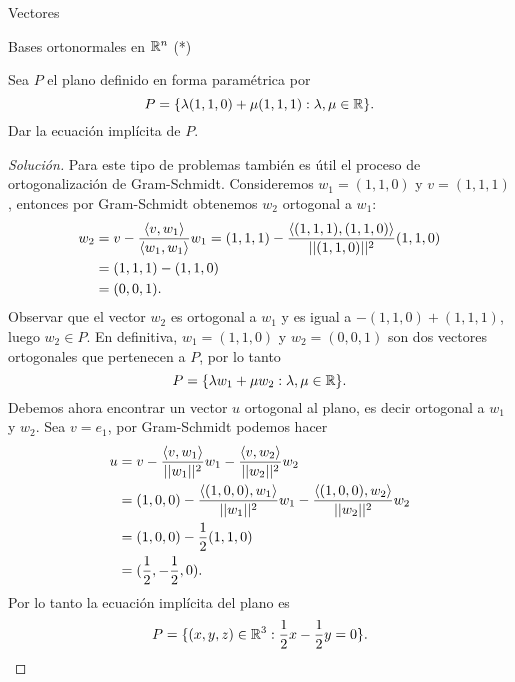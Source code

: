 \begin{chapter}{Vectores}
\begin{section}{Bases ortonormales en $\mathbb R^n$ (*)}
\begin{ejemplo*}
    Sea $P$ el plano definido en forma paramétrica por 
    \begin{equation*}
        P = \{\lambda(1,1,0) + \mu(1,1,1): \lambda, \mu \in \mathbb R\}.
    \end{equation*}
    Dar la ecuación implícita de $P$.
\end{ejemplo*}
\begin{proof}[Solución]
    Para  este tipo de problemas también es útil el proceso de ortogonalización de Gram-Schmidt. Consideremos $w_1 = (1,1,0)$ y $v =(1,1,1)$,  entonces por Gram-Schmidt obtenemos $w_2$ ortogonal a $w_1$:
    \begin{align*}
        w_2 &= v - \frac{\langle v,w_1\rangle}{\langle w_1,w_1\rangle}w_1  = (1,1,1) - \frac{\langle (1,1,1),(1,1,0)\rangle}{||(1,1,0)||^2}(1,1,0) \\
        &=  (1,1,1) - (1,1,0) \\
        &=(0,0,1).
    \end{align*}
    Observar que el vector $w_2$ es ortogonal a $w_1$ y  es igual a  $ - (1,1,0) + (1,1,1)$, luego $w_2 \in P$. En definitiva, $w_1 = (1,1,0)$ y $w_2=(0,0,1)$ son dos vectores ortogonales que pertenecen a $P$, por lo tanto 
    \begin{equation*}
        P = \{\lambda w_1 + \mu w_2: \lambda, \mu \in \mathbb R\}.
    \end{equation*}
    Debemos ahora encontrar un vector $u$ ortogonal al plano,  es decir ortogonal a $w_1$ y $w_2$. Sea $v =e_1$, por Gram-Schmidt podemos hacer
    \begin{align*}
        u&= v - \frac{\langle v,w_1\rangle}{||w_1||^2}w_1- \frac{\langle v,w_2\rangle}{||w_2||^2}w_2 \\
        &= (1,0,0) - \frac{\langle (1,0,0),w_1\rangle}{||w_1||^2}w_1- \frac{\langle (1,0,0), w_2\rangle}{||w_2||^2} w_2\\
        &= (1,0,0) - \frac{1}{2}(1,1,0)  \\
        &= (\frac{1}{2},-\frac{1}{2},0).
       \end{align*}
      Por lo tanto  la ecuación implícita del plano es
      \begin{equation*}
        P = \{(x,y,z)\in \mathbb R^3: \frac{1}{2}x-\frac{1}{2}y =0\}.
      \end{equation*}
\end{proof}

\end{section}

\end{chapter}